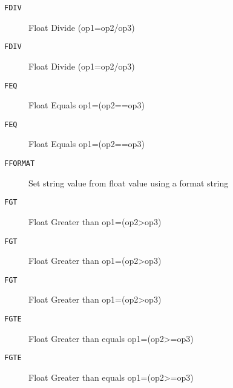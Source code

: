 \begin{description}
\item[\texttt{FDIV}]  Float Divide (op1=op2/op3)\\

\end{description}
\begin{description}
\item[\texttt{FDIV}]  Float Divide (op1=op2/op3)\\

\end{description}
\begin{description}
\item[\texttt{FEQ}]  Float Equals op1=(op2==op3)\\

\end{description}
\begin{description}
\item[\texttt{FEQ}]  Float Equals op1=(op2==op3)\\

\end{description}
\begin{description}
\item[\texttt{FFORMAT}]  Set string value from float value using a format string\\

\end{description}
\begin{description}
\item[\texttt{FGT}]  Float Greater than op1=(op2>op3)\\

\end{description}
\begin{description}
\item[\texttt{FGT}]  Float Greater than op1=(op2>op3)\\

\end{description}
\begin{description}
\item[\texttt{FGT}]  Float Greater than op1=(op2>op3)\\

\end{description}
\begin{description}
\item[\texttt{FGTE}]  Float Greater than equals op1=(op2>=op3)\\

\end{description}
\begin{description}
\item[\texttt{FGTE}]  Float Greater than equals op1=(op2>=op3)\\

\end{description}
